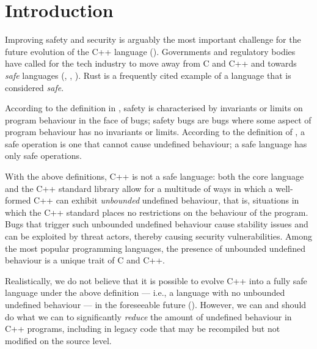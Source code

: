 
\tableofcontents*
\pagebreak





\section{Introduction}
\label{intro}

Improving safety and security is arguably the most important challenge for the future evolution of the C++ language (\cite{Bastien2023}). Governments and regulatory bodies have called for the tech industry to move away from C and C++ and towards \emph{safe} languages (\cite{NSA2022}, \cite{CR2023}, \cite{CISA2023}). Rust is a frequently cited example of a language that is considered \emph{safe}.

According to the definition in \cite{Carruth2023}, safety is characterised by invariants or limits on program behaviour in the face of bugs; safety bugs are bugs where some aspect of program behaviour has no invariants or limits. According to the definition of \cite{Abrahams2023}, a safe operation is one that cannot cause undefined behaviour; a safe language has only safe operations.

With the above definitions, C++ is not a safe language: both the core language and the C++ standard library allow for a multitude of ways in which a well-formed C++ can exhibit \emph{unbounded} undefined behaviour, that is, situations in which the C++ standard places no restrictions on the behaviour of the program. Bugs that trigger such unbounded undefined behaviour cause stability issues and can be exploited by threat actors, thereby causing security vulnerabilities. Among the most popular programming languages, the presence of unbounded undefined behaviour is a unique trait of C and C++. 

Realistically, we do not believe that it is possible to evolve C++ into a fully safe language under the above definition --- i.e., a language with no unbounded undefined behaviour --- in the foreseeable future (\cite{Doumler2023}). However, we can and should do what we can to significantly \emph{reduce} the amount of undefined behaviour in C++ programs, including in legacy code that may be recompiled but not modified on the source level.

